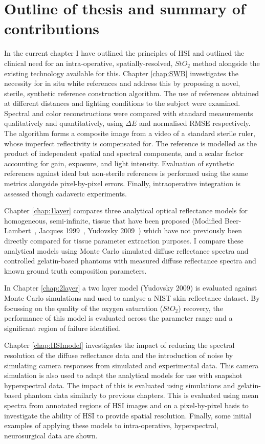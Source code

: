\section{Outline of thesis and summary of contributions}\label{sec:thesisoutline}
In the current chapter I have outlined the principles of HSI and outlined the clinical need for an intra-operative, spatially-resolved, $StO_2$ method alongside the existing technology available for this. 
Chapter \ref{chap:SWB} investigates the necessity for in situ white references and address this by proposing a novel, sterile, synthetic reference construction algorithm. The use of references obtained at different distances and lighting conditions to the subject were examined. Spectral and color reconstructions were compared with standard measurements qualitatively and quantitatively, using $\Delta E$ and normalised RMSE respectively. The algorithm forms a composite image from a video of a standard sterile ruler, whose imperfect reflectivity is compensated for. The reference is modelled as the product of independent spatial and spectral components, and a scalar factor accounting for gain, exposure, and light intensity. Evaluation of synthetic references against ideal but non-sterile references is performed using the same metrics alongside pixel-by-pixel errors. Finally, intraoperative integration is assessed though cadaveric experiments.

Chapter \ref{chap:1layer} compares three analytical optical reflectance models for homogeneous, semi-infinite, tissue that have been proposed (Modified Beer-Lambert~\citep{Clancy2015}, Jacques 1999~\citep{Jacques1999}, Yudovsky 2009~\citep{Yudovsky2009}) which have not previously been directly compared for tissue parameter extraction purposes. I compare these analytical models using Monte Carlo simulated diffuse reflectance spectra and controlled gelatin-based phantoms with measured diffuse reflectance spectra and known ground truth composition parameters. 

In Chapter \ref{chap:2layer} a two layer model (Yudovsky 2009) is evaluated against Monte Carlo simulations and used to analyse a NIST skin reflectance dataset. By focussing on the quality of the oxygen saturation ($StO_2$) recovery, the performance of this model is evaluated across the parameter range and a significant region of failure identified. 

Chapter \ref{chap:HSImodel} investigates the impact of reducing the spectral resolution of the diffuse reflectance data and the introduction of noise by simulating camera responses from simulated and experimental data. This camera simulation is also used to adapt the analytical models for use with snapshot hyperspectral data. The impact of this is evaluated using simulations and gelatin-based phantom data similarly to previous chapters. This is evaluated using mean spectra from annotated regions of HSI images and on a pixel-by-pixel basis to investigate the ability of HSI to provide spatial resolution. Finally, some initial examples of applying these models to intra-operative, hyperspectral, neurosurgical data are shown. 